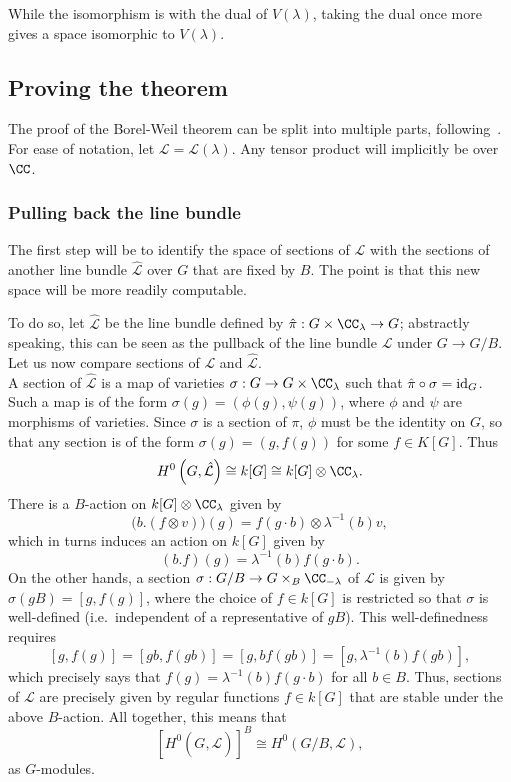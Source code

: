 While the isomorphism is with the dual of $V(\lambda)$, taking the dual once more gives a space isomorphic to $V(\lambda)$.

\subsection{Proving the theorem}
The proof of the Borel-Weil theorem can be split into multiple parts, following~\cite{kumar}. For ease of notation, let $\mathcal{L} = \mathcal{L}(\lambda)$. Any tensor product will implicitly be over $\CC$. 

\subsubsection{Pulling back the line bundle}
The first step will be to identify the space of sections of $\mathcal{L}$ with the sections of another line bundle $\hat{\mathcal{L}}$ over $G$ that are fixed by $B$. The point is that this new space will be more readily computable.

To do so, let $\hat{\mathcal{L}}$ be the line bundle defined by $\hat{\pi} : G \times \CC_{\lambda} \to G$; abstractly speaking, this can be seen as the pullback of the line bundle $\mathcal{L}$ under $G \rightarrow G/B$. Let us now compare sections of $\mathcal{L}$ and $\hat{\mathcal{L}}$.\\
A section of $\hat{\mathcal{L}}$ is a map of varieties $\sigma: G \rightarrow G \times \CC_{\lambda}$ such that $\hat{\pi} \circ \sigma = \textnormal{id}_G$. Such a map is of the form $\sigma(g) = (\phi(g), \psi(g))$, where $\phi$ and $\psi$ are morphisms of varieties. Since $\sigma$ is a section of $\pi$, $\phi$ must be the identity on $G$, so that any section is of the form $\sigma(g) = (g, f(g))$ for some $f \in K[G]$. Thus
\[ H^0\left(G, \hat{\mathcal{L}}\right) \cong k[G] \cong k[G] \otimes \CC_{\lambda}. \]
There is a $B$-action on $k[G] \otimes \CC_{\lambda}$ given by
\[ \bigl(b . (f \otimes v)\bigr) (g) = f(g \cdot b) \otimes \lambda^{-1}(b) v, \]
which in turns induces an action on $k[G]$ given by
\[ (b.f)(g) = \lambda^{-1}(b) f(g \cdot b).\]
On the other hands, a section $\sigma : G/B \to G \times_B \CC_{-\lambda}$ of $\mathcal{L}$ is given by $\sigma(g B) = [g, f(g)]$, where the choice of $f \in k[G]$ is restricted so that $\sigma$ is well-defined (i.e.~independent of a representative of $gB$). This well-definedness requires
\[ [g, f(g)] = [gb, f(gb)] = [g, bf(gb)] = [g, \lambda^{-1}(b)f(gb)], \]
which precisely says that $f(g) = \lambda^{-1}(b)f(g\cdot b)$ for all $b \in B$. Thus, sections of $\mathcal{L}$ are precisely given by regular functions $f \in k[G]$ that are stable under the above $B$-action. All together, this means that 
\[ {\left[H^{0}\left(G, \hat{\mathcal{L}}\right)\right]}^{B} \cong H^{0}(G/B, \mathcal{L}), \]
as $G$-modules.
